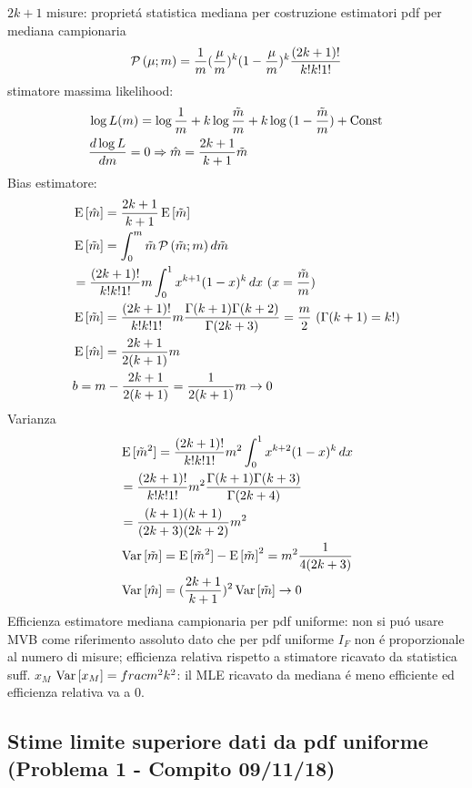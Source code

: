 \begin{frame}{$2k+1$ misure: propriet\'a statistica mediana per costruzione estimatori}
pdf per mediana campionaria
\begin{equation*}	\prob{(\mu;m)}=\frac{1}{m}(\frac{\mu}{m})^k(1-\frac{\mu}{m})^k\frac{(2k+1)!}{k!k!1!}
\end{equation*}
stimatore massima likelihood:
\begin{align*}
&\log{L(m)}=\log{\frac{1}{m}}+k\log{\frac{\tilde{m}}{m}}+k\log{(1-\frac{\tilde{m}}{m})}+\const{}\\
&\TDy{m}{\log{L}}=0 \Rightarrow \hat{m}=\frac{2k+1}{k+1}\tilde{m}
\end{align*}
Bias estimatore:
\begin{align*}
&\E{[\hat{m}]}=\frac{2k+1}{k+1}\E{[\tilde{m}]}\\
&\E{[\tilde{m}]}=\int_0^m\tilde{m}\prob{(\tilde{m};m)}\,d\tilde{m}\\
&=\frac{(2k+1)!}{k!k!1!}m\int_0^1x^{k+1}(1-x)^k\,dx\ (x=\frac{\tilde{m}}{m})\\
&\E{[\tilde{m}]}=\frac{(2k+1)!}{k!k!1!}m\frac{\Gamma(k+1)\Gamma(k+2)}{\Gamma(2k+3)}=\frac{m}{2}\ (\Gamma(k+1)=k!)\\
&\E{[\hat{m}]}=\frac{2k+1}{2(k+1)}m\\
&b=m-\frac{2k+1}{2(k+1)}=\frac{1}{2(k+1)}m\to0
\end{align*}
Varianza
\begin{align*}
&\E{[\tilde{m}^2]}=\frac{(2k+1)!}{k!k!1!}m^2\int_0^1x^{k+2}(1-x)^k\,dx\\
&=\frac{(2k+1)!}{k!k!1!}m^2\frac{\Gamma(k+1)\Gamma(k+3)}{\Gamma(2k+4)}\\
&=\frac{(k+1)(k+1)}{(2k+3)(2k+2)}m^2\\
&\var{[\tilde{m}]}=\E{[\tilde{m}^2]}-\E{[\tilde{m}]}^2=m^2\frac{1}{4(2k+3)}\\
&\var{[\hat{m}]}=(\frac{2k+1}{k+1})^2\var{[\tilde{m}]}\to0
\end{align*}
Efficienza estimatore mediana campionaria per pdf uniforme: non si pu\'o usare MVB come riferimento assoluto dato che per pdf uniforme $I_F$ non \'e proporzionale al numero di misure; efficienza relativa rispetto a stimatore ricavato da statistica suff. $x_M$ $\var{[x_M]}=frac{m^2}{k^2}$: il MLE ricavato da mediana \'e meno efficiente ed efficienza relativa va a 0.
\end{frame}

\subsection{Stime limite superiore dati da pdf uniforme (Problema 1 - Compito 09/11/18)}

